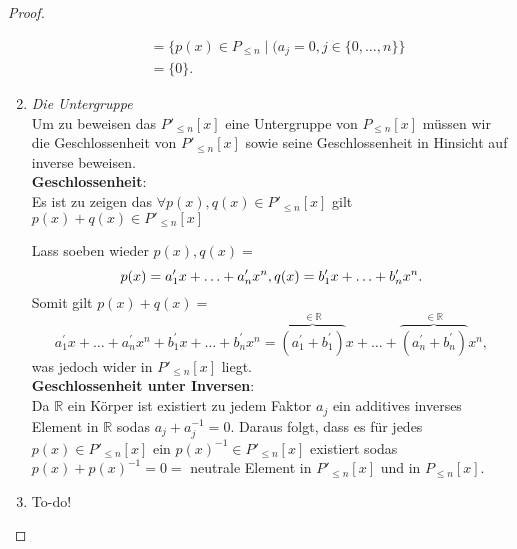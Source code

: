 \documentclass{../problemset}
\begin{document}
\begin{problem}
\begin{proof}
\begin{enumerate}
\begin{align}
			                                 & = \{p(x) \in P_{\le n} \mid (a_j = 0, j \in \{0, \ldots, n\}\}                                                                    \\
			                                 & = \{0\}.
		      \end{align}
		      \checkmark
		\item \textit{Die Untergruppe} \\
		      Um zu beweisen das $P'_{\le n}[x]$ eine Untergruppe von $P_{\le n}[x]$ müssen wir die Geschlossenheit von $P'_{\le n}[x]$ sowie seine Geschlossenheit in Hinsicht auf inverse beweisen. \\
		      \textbf{Geschlossenheit}: \\
		      Es ist zu zeigen das $\forall p(x),q(x) \in P'_{\le n}[x]$ gilt $p(x) + q(x) \in P'_{\le n}[x]$

		      Lass soeben wieder $p(x), q(x) =$ \[
			      p(x) = a^\prime_1x + \ldots + a^\prime_nx^n, \\
			      q(x) = b^\prime_1x + \ldots + b^\prime_nx^n.
		      \]
		      Somit gilt $p(x) + q(x) =$ \[
			      a^\prime_1x + \ldots + a^\prime_nx^n + b^\prime_1x + \ldots + b^\prime_nx^n =
			      \overbrace{(a^\prime_1+b^\prime_1)}^{\in \mathbb{R}}x + \ldots + \overbrace{(a^\prime_n+b^\prime_n)}^{\in \mathbb{R}}x^n,
		      \] was jedoch wider in $P'_{\le n}[x]$ liegt.
		      \checkmark
		      \\
		      \textbf{Geschlossenheit unter Inversen}: \\
		      Da $\mathbb{R}$ ein Körper ist existiert zu jedem Faktor $a_j$ ein additives inverses Element in $\mathbb{R}$ sodas $a_j + a_j^{-1} = 0$.
		      Daraus folgt, dass es für jedes $p(x) \in P'_{\le n}[x]$ ein $p(x)^{-1} \in P'_{\le n}[x]$ existiert sodas $p(x) + p(x)^{-1} = 0 =$ neutrale Element in $P'_{\le n}[x]$ und in $P_{\le n}[x]$.
		      \checkmark
		\item To-do!
	\end{enumerate}
\end{proof}

\end{problem}

\pagebreak
\end{document}
